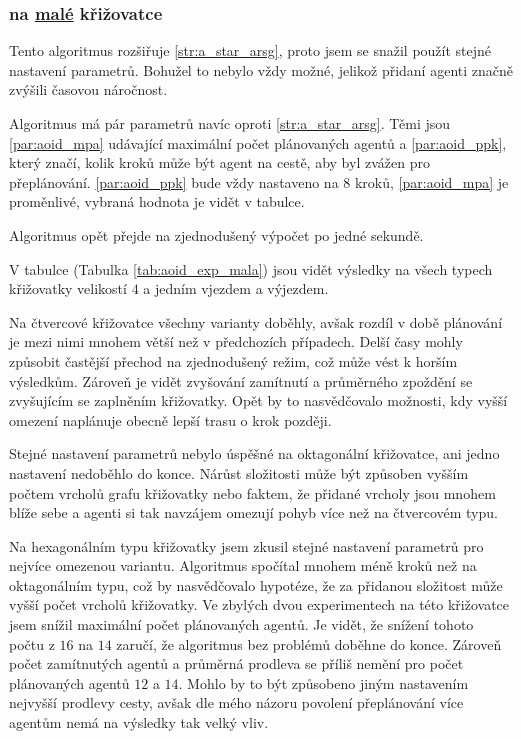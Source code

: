 \subsubsection{ na \hyperref[par:data_mala]{malé} křižovatce}
\label{subsubsec:exp_aoid_mala_krizovatka}

Tento algoritmus rozšiřuje \ref{str:a_star_arsg}, proto jsem se snažil použít stejné nastavení parametrů.
Bohužel to nebylo vždy možné, jelikož přidaní agenti značně zvýšili časovou náročnost.

Algoritmus má pár parametrů navíc oproti \ref{str:a_star_arsg}.
Těmi jsou \ref{par:aoid_mpa} udávající maximální počet plánovaných agentů
a \ref{par:aoid_ppk}, který značí, kolik kroků může být agent na cestě, aby byl zvážen pro přeplánování.
\ref{par:aoid_ppk} bude vždy nastaveno na $8$ kroků,
\ref{par:aoid_mpa} je proměnlivé, vybraná hodnota je vidět v tabulce.

Algoritmus opět přejde na zjednodušený výpočet po jedné sekundě.

V tabulce (Tabulka \ref{tab:aoid_exp_mala}) jsou vidět výsledky na všech typech křižovatky
velikostí $4$ a jedním vjezdem a výjezdem.

Na čtvercové křižovatce všechny varianty doběhly,
avšak rozdíl v době plánování je mezi nimi mnohem větší než v předchozích případech.
Delší časy mohly způsobit častější přechod na zjednodušený režim, což může vést k horším výsledkům.
Zároveň je vidět zvyšování zamítnutí a průměrného zpoždění se zvyšujícím se zaplněním křižovatky.
Opět by to nasvědčovalo možnosti, kdy vyšší omezení naplánuje obecně lepší trasu o krok později.

Stejné nastavení parametrů nebylo úspěšné na oktagonální křižovatce, ani jedno nastavení nedoběhlo do konce.
Nárůst složitosti může být způsoben vyšším počtem vrcholů grafu křižovatky
nebo faktem, že přidané vrcholy jsou mnohem blíže sebe
a agenti si tak navzájem omezují pohyb více než na čtvercovém typu.

Na hexagonálním typu křižovatky jsem zkusil stejné nastavení parametrů pro nejvíce omezenou variantu.
Algoritmus spočítal mnohem méně kroků než na oktagonálním typu, což by nasvědčovalo hypotéze,
že za přidanou složitost může vyšší počet vrcholů křižovatky.
Ve zbylých dvou experimentech na této křižovatce jsem snížil maximální počet plánovaných agentů.
Je vidět, že snížení tohoto počtu z $16$ na $14$ zaručí, že algoritmus bez problémů doběhne do konce.
Zároveň počet zamítnutých agentů a průměrná prodleva se příliš nemění pro počet plánovaných agentů $12$ a $14$.
Mohlo by to být způsobeno jiným nastavením nejvyšší prodlevy cesty,
avšak dle mého názoru povolení přeplánování více agentům nemá na výsledky tak velký vliv.

